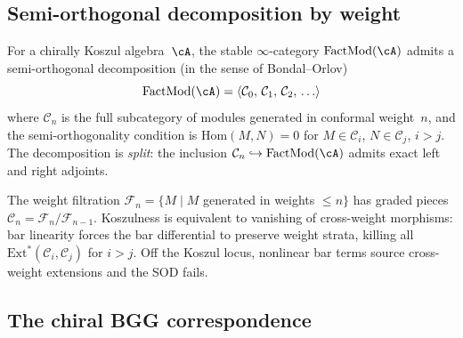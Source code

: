 \subsection{Semi-orthogonal decomposition by weight}

\begin{conjecture}
\label{conj:sod-by-weight}
For a chirally Koszul algebra~$\cA$, the stable $\infty$-category
$\mathrm{FactMod}(\cA)$ admits a semi-orthogonal decomposition
\textup{(}in the sense of Bondal--Orlov\textup{)}
\[
 \mathrm{FactMod}(\cA) = \langle \mathcal{C}_0,\, \mathcal{C}_1,\,
 \mathcal{C}_2,\, \ldots \rangle
\]
where $\mathcal{C}_n$ is the full subcategory of modules generated in
conformal weight~$n$, and the semi-orthogonality condition is
$\mathrm{Hom}(M, N) = 0$ for $M \in \mathcal{C}_i$,
$N \in \mathcal{C}_j$, $i > j$. The decomposition is \emph{split}:
the inclusion $\mathcal{C}_n \hookrightarrow \mathrm{FactMod}(\cA)$
admits exact left and right adjoints.
\end{conjecture}

\noindent
The weight filtration $\mathcal{F}_n = \{M \mid M$
generated in weights $\leq n\}$ has graded pieces
$\mathcal{C}_n = \mathcal{F}_n / \mathcal{F}_{n-1}$.
Koszulness is equivalent to vanishing of cross-weight morphisms:
bar linearity forces the bar differential to preserve weight strata,
killing all $\mathrm{Ext}^*(\mathcal{C}_i, \mathcal{C}_j)$ for
$i > j$. Off the Koszul locus, nonlinear bar terms source
cross-weight extensions and the SOD fails.

\subsection{The chiral BGG correspondence}

